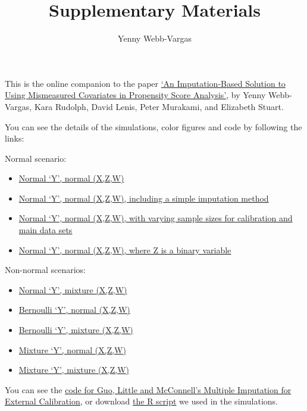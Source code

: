 \documentclass[]{article}
\title{Supplementary Materials}
\author{Yenny Webb-Vargas}
\date{}
\begin{document}
\maketitle


This is the online companion to the paper
\href{http://biostats.bepress.com/jhubiostat/paper269/}{`An
Imputation-Based Solution to Using Mismeasured Covariates in Propensity
Score Analysis'}, by Yenny Webb-Vargas, Kara Rudolph, David Lenis, Peter
Murakami, and Elizabeth Stuart.

You can see the details of the simulations, color figures and code by
following the links:

Normal scenario:

\begin{itemize}
\itemsep1pt\parskip0pt
\item
  \href{http://ywebbvar.github.io/PS_MIEC/Simulations/Y_normal_XZW_normal/}{Normal
  `Y', normal (X,Z,W)}
\item
  \href{http://ywebbvar.github.io/PS_MIEC/Simulations/Simple_imputation/}{Normal
  `Y', normal (X,Z,W), including a simple imputation method}
\item
  \href{http://ywebbvar.github.io/PS_MIEC/Simulations/Sample_sizes/}{Normal
  `Y', normal (X,Z,W), with varying sample sizes for calibration and
  main data sets}
\item
  \href{http://ywebbvar.github.io/PS_MIEC/Simulations/CategoricalZ/}{Normal
  `Y', normal (X,Z,W), where Z is a binary variable}
\end{itemize}

Non-normal scenarios:

\begin{itemize}
\itemsep1pt\parskip0pt
\item
  \href{http://ywebbvar.github.io/PS_MIEC/Simulations/Y_normal_XZW_mixture/}{Normal
  `Y', mixture (X,Z,W)}
\item
  \href{http://ywebbvar.github.io/PS_MIEC/Simulations/Y_bernoulli_XZW_normal/}{Bernoulli
  `Y', normal (X,Z,W)}
\item
  \href{http://ywebbvar.github.io/PS_MIEC/Simulations/Y_bernoulli_XZW_mixture/}{Bernoulli
  `Y', mixture (X,Z,W)}
\item
  \href{http://ywebbvar.github.io/PS_MIEC/Simulations/Y_mixture_XZW_normal/}{Mixture
  `Y', normal (X,Z,W)}
\item
  \href{http://ywebbvar.github.io/PS_MIEC/Simulations/Y_mixture_XZW_mixture/}{Mixture
  `Y', mixture (X,Z,W)}
\end{itemize}

You can see the
\href{http://ywebbvar.github.io/PS_MIEC/MIEC_original/}{code for Guo,
Little and McConnell's Multiple Imputation for External Calibration}, or
download
\href{http://ywebbvar.github.io/PS_MIEC/MIEC_original/MI-EC_algorithm.r}{the
R script} we used in the simulations.
\end{document}
